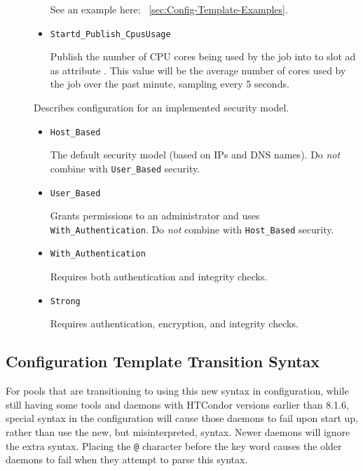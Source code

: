\begin{description}
\begin{itemize}
	See an example here: ~\ref{sec:Config-Template-Examples}.

	\item \texttt{Startd\_Publish\_CpusUsage}

	Publish the number of CPU cores being used by the job into
	to slot ad as attribute . This value will
	be the average number of cores used by the job over the
	past minute, sampling every 5 seconds.
  \end{itemize}

\label{usecategory:SECURITY}
\item[\MacroNI{SECURITY category}]
  Describes configuration for an implemented security model.
  \begin{itemize}
    \item \texttt{Host\_Based}

    The default security model (based on IPs and DNS names).
    Do \emph{not} combine with \texttt{User\_Based} security.

    \item \texttt{User\_Based}

    Grants permissions to an administrator and uses 
    \texttt{With\_Authentication}.
    Do \emph{not} combine with \texttt{Host\_Based} security.

    \item \texttt{With\_Authentication}

    Requires both authentication and integrity checks.

    \item \texttt{Strong}

    Requires authentication, encryption, and integrity checks.
  \end{itemize}

\end{description}

\subsection{\label{sec:Config-Template-Transition-Syntax}Configuration
Template Transition Syntax}

For pools that are transitioning to using this new syntax in configuration,
while still having some tools and daemons with HTCondor versions 
earlier than 8.1.6,
special syntax in the configuration will cause those daemons to
fail upon start up,
rather than use the new, but misinterpreted, syntax. 
Newer daemons will ignore the extra syntax.
Placing the \verb|@| character before the  key word
causes the older daemons to fail when they attempt to
parse this syntax.

